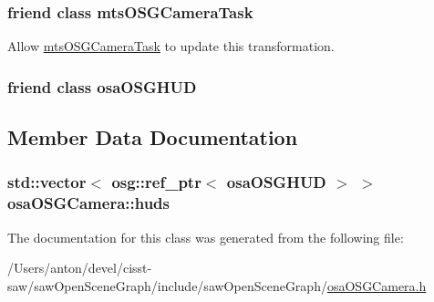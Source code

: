 \subsubsection[{mts\+O\+S\+G\+Camera\+Task}]{\setlength{\rightskip}{0pt plus 5cm}friend class {\bf mts\+O\+S\+G\+Camera\+Task}\hspace{0.3cm}{\ttfamily [friend]}}\label{classosa_o_s_g_camera_a7f45bb9ad9fefaf19bb707da99c35df7}


Allow \hyperlink{classmts_o_s_g_camera_task}{mts\+O\+S\+G\+Camera\+Task} to update this transformation. 

\hypertarget{classosa_o_s_g_camera_a558e1c2494d52ebb0ac01ac496c5e888}{}
\subsubsection[{osa\+O\+S\+G\+H\+U\+D}]{\setlength{\rightskip}{0pt plus 5cm}friend class {\bf osa\+O\+S\+G\+H\+U\+D}\hspace{0.3cm}{\ttfamily [friend]}}\label{classosa_o_s_g_camera_a558e1c2494d52ebb0ac01ac496c5e888}


\subsection{Member Data Documentation}
\hypertarget{classosa_o_s_g_camera_a237022117dad9914d09ca392c455448b}{}
\subsubsection[{huds}]{\setlength{\rightskip}{0pt plus 5cm}std\+::vector$<$ osg\+::ref\+\_\+ptr$<$ {\bf osa\+O\+S\+G\+H\+U\+D} $>$ $>$ osa\+O\+S\+G\+Camera\+::huds\hspace{0.3cm}{\ttfamily [protected]}}\label{classosa_o_s_g_camera_a237022117dad9914d09ca392c455448b}


The documentation for this class was generated from the following file\+:\begin{DoxyCompactItemize}
\item 
/\+Users/anton/devel/cisst-\/saw/saw\+Open\+Scene\+Graph/include/saw\+Open\+Scene\+Graph/\hyperlink{osa_o_s_g_camera_8h}{osa\+O\+S\+G\+Camera.\+h}\end{DoxyCompactItemize}
